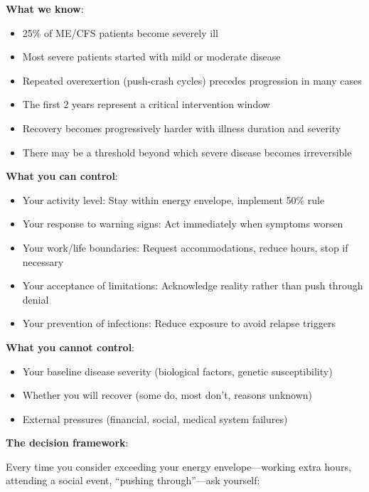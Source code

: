\begin{keypoint}

\textbf{What we know}:
\begin{itemize}
    \item 25\% of ME/CFS patients become severely ill
    \item Most severe patients started with mild or moderate disease
    \item Repeated overexertion (push-crash cycles) precedes progression in many cases
    \item The first 2 years represent a critical intervention window
    \item Recovery becomes progressively harder with illness duration and severity
    \item There may be a threshold beyond which severe disease becomes irreversible
\end{itemize}

\textbf{What you can control}:
\begin{itemize}
    \item Your activity level: Stay within energy envelope, implement 50\% rule
    \item Your response to warning signs: Act immediately when symptoms worsen
    \item Your work/life boundaries: Request accommodations, reduce hours, stop if necessary
    \item Your acceptance of limitations: Acknowledge reality rather than push through denial
    \item Your prevention of infections: Reduce exposure to avoid relapse triggers
\end{itemize}

\textbf{What you cannot control}:
\begin{itemize}
    \item Your baseline disease severity (biological factors, genetic susceptibility)
    \item Whether you will recover (some do, most don't, reasons unknown)
    \item External pressures (financial, social, medical system failures)
\end{itemize}

\textbf{The decision framework}:

Every time you consider exceeding your energy envelope---working extra hours, attending a social event, ``pushing through''---ask yourself:


\end{keypoint}
